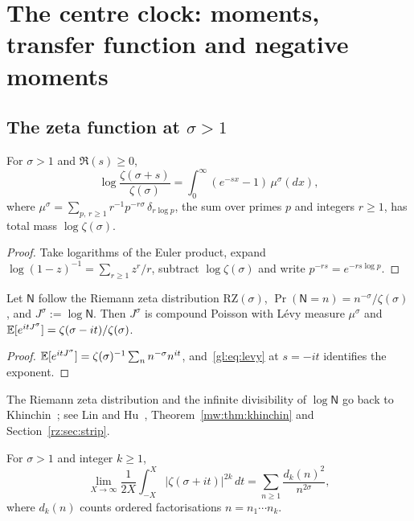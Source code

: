 \section{The centre clock: moments, transfer function and negative moments}\label{gl:sec:centre}

\subsection{The zeta function at \texorpdfstring{$\sigma>1$}{sigma > 1}}\label{gl:sec:sigma1}

\begin{lemma}\label{gl:lem:levy}
For $\sigma > 1$ and $\Re(s) \ge 0$,
\begin{equation}\label{gl:eq:levy}
\log\frac{\zeta(\sigma+s)}{\zeta(\sigma)} = \int_0^\infty (e^{-sx}-1)\,\mu^\sigma(dx),
\end{equation}
where $\mu^\sigma=\sum_{p,\,r\ge 1}r^{-1}p^{-r\sigma}\,\delta_{r\log p}$, the sum over primes $p$ and integers $r\ge1$, has total mass $\log\zeta(\sigma)$.
\end{lemma}

\begin{proof}
Take logarithms of the Euler product, expand $\log(1-z)^{-1}=\sum_{r\ge1}z^r/r$, subtract $\log\zeta(\sigma)$ and write $p^{-rs}=e^{-rs\log p}$.
\end{proof}

\begin{lemma}\label{gl:lem:RZ}
Let $\mathsf N$ follow the Riemann zeta distribution $\mathrm{RZ}(\sigma)$, $\Pr(\mathsf N = n) = n^{-\sigma}/\zeta(\sigma)$, and $J^\sigma := \log \mathsf N$. Then $J^\sigma$ is compound Poisson with L\'evy measure $\mu^\sigma$ and $\mathbb{E}[e^{itJ^\sigma}] = \zeta(\sigma-it)/\zeta(\sigma)$.
\end{lemma}

\begin{proof}
$\mathbb{E}[e^{itJ^\sigma}] = \zeta(\sigma)^{-1}\sum_n n^{-\sigma}n^{it}$, and~\eqref{gl:eq:levy} at $s=-it$ identifies the exponent.
\end{proof}

The Riemann zeta distribution and the infinite divisibility of $\log\mathsf N$ go back to Khinchin~\cite{Khinchin38}; see Lin and Hu~\cite{LinHu01}, Theorem~\ref{mw:thm:khinchin} and Section~\ref{rz:sec:strip}.

\begin{theorem}\label{gl:thm:wiener}
For $\sigma > 1$ and integer $k \ge 1$,
\begin{equation}\label{gl:eq:wiener}
\lim_{X\to\infty}\frac{1}{2X}\int_{-X}^{X}\big|\zeta(\sigma+it)\big|^{2k}\,dt = \sum_{n\ge1}\frac{d_k(n)^2}{n^{2\sigma}},
\end{equation}
where $d_k(n)$ counts ordered factorisations $n=n_1\cdots n_k$.
\end{theorem}

